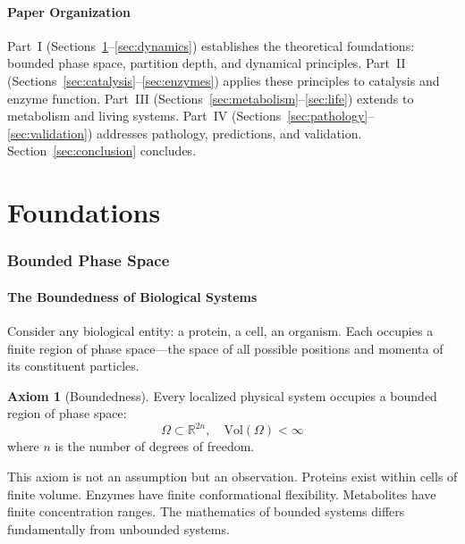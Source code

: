 ﻿\documentclass[twocolumn,10pt,a4paper]{article}
\theoremstyle{definition}
\newtheorem{axiom}{Axiom}
\theoremstyle{remark}
\begin{document}
\subsection{Paper Organization}

Part~I (Sections~\ref{sec:foundations}--\ref{sec:dynamics}) establishes the theoretical foundations: bounded phase space, partition depth, and dynamical principles. Part~II (Sections~\ref{sec:catalysis}--\ref{sec:enzymes}) applies these principles to catalysis and enzyme function. Part~III (Sections~\ref{sec:metabolism}--\ref{sec:life}) extends to metabolism and living systems. Part~IV (Sections~\ref{sec:pathology}--\ref{sec:validation}) addresses pathology, predictions, and validation. Section~\ref{sec:conclusion} concludes.

\part{Foundations}

\section{Bounded Phase Space}
\label{sec:foundations}

\subsection{The Boundedness of Biological Systems}

Consider any biological entity: a protein, a cell, an organism. Each occupies a finite region of phase space---the space of all possible positions and momenta of its constituent particles.

\begin{axiom}[Boundedness]
\label{ax:bounded}
Every localized physical system occupies a bounded region of phase space:
\begin{equation}
    \Omega \subset \mathbb{R}^{2n}, \quad \mathrm{Vol}(\Omega) < \infty
\end{equation}
where $n$ is the number of degrees of freedom.
\end{axiom}

This axiom is not an assumption but an observation. Proteins exist within cells of finite volume. Enzymes have finite conformational flexibility. Metabolites have finite concentration ranges. The mathematics of bounded systems differs fundamentally from unbounded systems.
\end{document}
